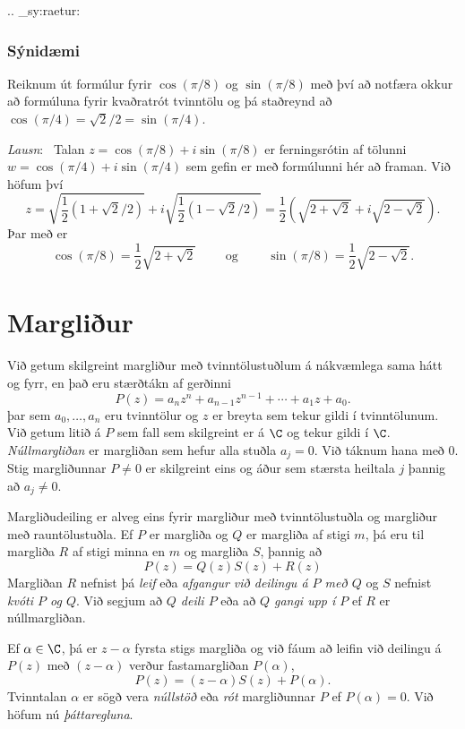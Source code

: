 .. _sy:raetur:

\subsubsection{Sýnidæmi}  Reiknum út formúlur fyrir $\cos(\pi/8)$
og $\sin(\pi/8)$ með því að notfæra okkur að
formúluna fyrir kvaðratrót tvinntölu og þá staðreynd
að $\cos(\pi/4)=\sqrt 2/2=\sin(\pi/4)$.  

\smallskip\noindent
{\it Lausn}: \ Talan $z=\cos(\pi/8)+i\sin(\pi/8)$ er
ferningsrótin af tölunni $w=\cos(\pi/4)+i\sin(\pi/4)$
sem gefin er með formúlunni hér að framan.  Við höfum því
$$
z=\sqrt{\dfrac 12(1+\sqrt 2/2)}+i\sqrt{\dfrac 12(1-
\sqrt 2/2)}=\dfrac 12(\sqrt{2+\sqrt 2}+i\sqrt{2-\sqrt 2}).
$$
Þar með er 
$$
\cos(\pi/8)=\dfrac 12\sqrt{2+\sqrt 2}\qquad \text{ og } \qquad
\sin(\pi/8)=\dfrac 12\sqrt{2-\sqrt 2}.
$$



\section{Margliður}

Við getum skilgreint margliður með tvinntölustuðlum á nákvæmlega sama
hátt og fyrr, en það eru stærðtákn af gerðinni
$$
P(z)=a_nz^n+a_{n-1}z^{n-1}+\cdots+a_1z+a_0.
$$
þar sem $a_0,\dots,a_n$ eru tvinntölur og $z$ er breyta sem tekur
gildi í tvinntölunum.  Við getum litið á $P$ sem fall sem skilgreint
er á $\C$ og tekur gildi í $\C$.  {\it Núllmargliðan} er margliðan sem
hefur alla stuðla $a_j=0$.  Við táknum hana með $0$.
Stig margliðunnar $P\neq 0$ er skilgreint eins og áður sem stærsta 
heiltala $j$ þannig að $a_j\neq 0$.  


Margliðudeiling er alveg eins fyrir margliður með tvinntölustuðla og
margliður með rauntölustuðla.  Ef $P$ er margliða  og 
$Q$ er margliða af stigi $m$, þá eru til margliða  $R$ af stigi minna en $m$
og margliða $S$, þannig að
$$
P(z)=Q(z)S(z)+R(z)
$$ 
Margliðan $R$ nefnist þá {\it leif} eða {\it afgangur við deilingu á
$P$ með $Q$} og $S$ nefnist {\it kvóti $P$ og $Q$}.  Við segjum að 
{\it $Q$ deili $P$} eða að {\it $Q$ gangi upp í $P$} ef $R$ er
núllmargliðan.  

Ef $\alpha\in \C$, þá er $z-\alpha$ fyrsta stigs margliða og við fáum
að leifin við deilingu á $P(z)$ með $(z-\alpha)$ verður fastamargliðan
$P(\alpha)$,
$$
P(z)=(z-\alpha)S(z)+P(\alpha).
$$
Tvinntalan $\alpha$ er sögð vera {\it núllstöð} eða {\it rót}
margliðunnar $P$ ef $P(\alpha)=0$.   Við höfum nú {\it  þáttaregluna}.

